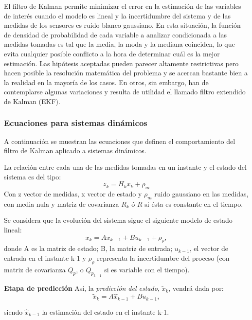 El filtro de Kalman permite minimizar el error en la estimación de las variables de interés cuando el modelo es lineal y la incertidumbre del sistema y de las medidas de los sensores es ruido blanco gaussiano. En esta situación, la función de densidad de probabilidad de cada variable a analizar condicionada a las medidas tomadas es tal que la media, la moda y la mediana coinciden, lo que evita cualquier posible conflicto a la hora de determinar cuál es la mejor estimación.
Las hipótesis aceptadas pueden parecer altamente restrictivas pero hacen posible la resolución matemática del problema y se acercan bastante bien a la realidad en la mayoría de los casos. En otros, sin embargo, han de contemplarse algunas variaciones y resulta de utilidad el llamado filtro extendido de Kalman (EKF).

\subsubsection{Ecuaciones para sistemas dinámicos}
A continuación se muestran las ecuaciones que definen el comportamiento del filtro de Kalman aplicado a sistemas dinámicos\cite{Schutter99}.

La relación entre cada una de las medidas tomadas en un instante y el estado del sistema es del tipo:
\begin{equation}\label{eq:measurement}
   z_{k} = H_{k}x_{k}+\rho_{m}
\end{equation}
Con z vector de medidas, x vector de estado y $\rho_{m}$ ruido gaussiano en las medidas, con media nula y matriz de covarianza $R_{k}$ ó $R$ si ésta es constante en el tiempo.

Se considera que la evolución del sistema sigue el siguiente modelo de estado lineal:
\begin{equation}\label{eq:model}
    x_{k} = Ax_{k-1}+Bu_{k-1}+\rho_{\rho},
\end{equation}
donde A es la matriz de estado; B, la matriz de entrada; $u_{k-1}$, el vector de entrada en el instante k-1 y $\rho_{\rho}$ representa la incertidumbre del proceso (con matriz de covarianza $Q_{p}$, o $Q_{p_{k-1}}$ si es variable con el tiempo).


\textbf{Etapa de predicción}
Así, la \emph{predicción del estado}, $\tilde{x}_{k}$, vendrá dada por:
\begin{equation}\label{eq:x_prediction}
    \tilde{x}_{k} = A\hat{x}_{k-1}+Bu_{k-1},
\end{equation}

siendo $\hat{x}_{k-1}$ la estimación del estado en el instante k-1.

